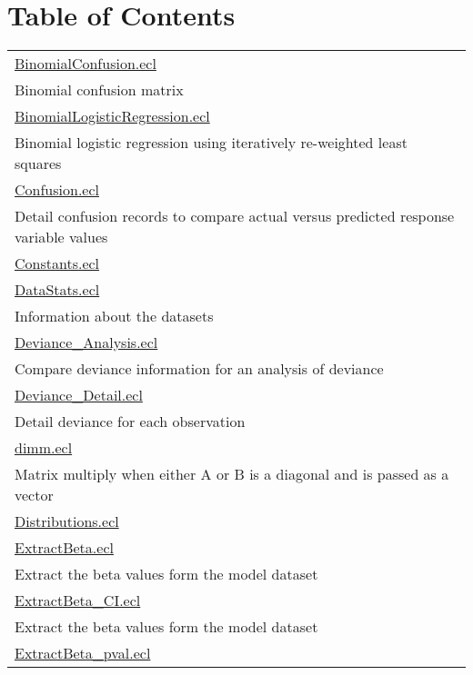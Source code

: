 \section*{Table of Contents}
{\renewcommand{\arraystretch}{1.5}
\begin{longtable}{|p{\textwidth}|}
\hline
\hyperlink{ecldoc:toc:LogisticRegression.BinomialConfusion}{BinomialConfusion.ecl} \\
Binomial confusion matrix \\
\hline
\hyperlink{ecldoc:toc:LogisticRegression.BinomialLogisticRegression}{BinomialLogisticRegression.ecl} \\
Binomial logistic regression using iteratively re-weighted least squares \\
\hline
\hyperlink{ecldoc:toc:LogisticRegression.Confusion}{Confusion.ecl} \\
Detail confusion records to compare actual versus predicted response variable values \\
\hline
\hyperlink{ecldoc:toc:LogisticRegression.Constants}{Constants.ecl} \\
\hline
\hyperlink{ecldoc:toc:LogisticRegression.DataStats}{DataStats.ecl} \\
Information about the datasets \\
\hline
\hyperlink{ecldoc:toc:LogisticRegression.Deviance_Analysis}{Deviance\_Analysis.ecl} \\
Compare deviance information for an analysis of deviance \\
\hline
\hyperlink{ecldoc:toc:LogisticRegression.Deviance_Detail}{Deviance\_Detail.ecl} \\
Detail deviance for each observation \\
\hline
\hyperlink{ecldoc:toc:LogisticRegression.dimm}{dimm.ecl} \\
Matrix multiply when either A or B is a diagonal and is passed as a vector \\
\hline
\hyperlink{ecldoc:toc:LogisticRegression.Distributions}{Distributions.ecl} \\
\hline
\hyperlink{ecldoc:toc:LogisticRegression.ExtractBeta}{ExtractBeta.ecl} \\
Extract the beta values form the model dataset \\
\hline
\hyperlink{ecldoc:toc:LogisticRegression.ExtractBeta_CI}{ExtractBeta\_CI.ecl} \\
Extract the beta values form the model dataset \\
\hline
\hyperlink{ecldoc:toc:LogisticRegression.ExtractBeta_pval}{ExtractBeta\_pval.ecl} \\

\end{longtable}}
